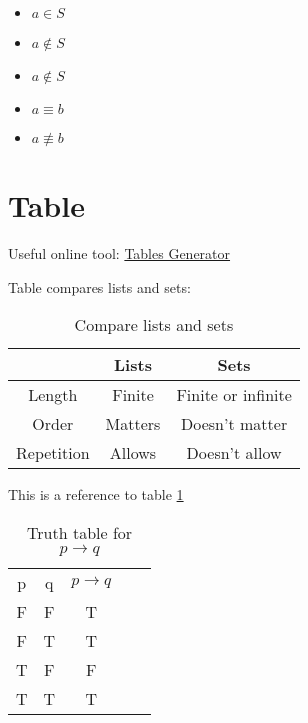 \documentclass[12pt, letterpaper, oneside]{article}
\begin{document}
\begin{itemize}
  \item $a \in S$
  \item $a \notin S$
  \item $a \not\in S$
  \item $a \equiv b$
  \item $a \not\equiv b$
\end{itemize}

\section{Table}

Useful online tool: \href{https://www.tablesgenerator.com/}{Tables Generator}

Table compares lists and sets:
\begin{table}[H]
  \centering
  \begin{tabular}{||c c c ||}
    \hline
               & Lists   & Sets               \\ [0.5ex]
    \hline
    \hline
    Length     & Finite  & Finite or infinite \\
    Order      & Matters & Doesn't matter     \\
    Repetition & Allows  & Doesn't allow      \\ [1ex]
    \hline
  \end{tabular}
  \caption{Compare lists and sets}
  \label{table:lists_sets_comp}
\end{table}

This is a reference to table \ref{table:lists_sets_comp}

\begin{table}[H]
  \centering
  \begin{tabular}{|c|c|c|ll}
    \cline{1-3}
    p & q & $p \rightarrow q$ &  & \\ [1ex] \cline{1-3}
    F & F & T                 &  & \\ [0.5ex] \cline{1-3}
    F & T & T                 &  & \\ [0.5ex] \cline{1-3}
    T & F & F                 &  & \\ [0.5ex] \cline{1-3}
    T & T & T                 &  & \\ [0.5ex] \cline{1-3}
  \end{tabular}
  \caption{Truth table for $p \rightarrow q$}
\end{table}
\end{document}
